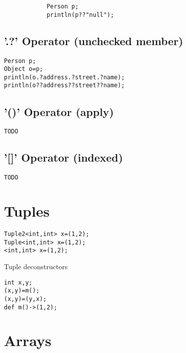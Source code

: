 \documentclass{tufte-book}
\begin{document}
            \begin{lstlisting}
            Person p;
            println(p??"null");
            \end{lstlisting}


            \subsection{'.?' Operator (unchecked member)}
            \begin{lstlisting}
Person p;
Object o=p;
println(o.?address.?street.?name);
println(o??address??street??name);
            \end{lstlisting}

            \subsection{'()' Operator (apply)}
            \begin{lstlisting}
TODO
            \end{lstlisting}

            \subsection{'[]' Operator (indexed)}
            \begin{lstlisting}
TODO
            \end{lstlisting}

            \section{Tuples}
            \begin{lstlisting}
Tuple2<int,int> x=(1,2);
Tuple<int,int> x=(1,2);
<int,int> x=(1,2);
            \end{lstlisting}

            Tuple deconstructors
            \begin{lstlisting}
int x,y;
(x,y)=m();
(x,y)=(y,x);
def m()->(1,2);
            \end{lstlisting}

            \section{Arrays}
\end{document}
